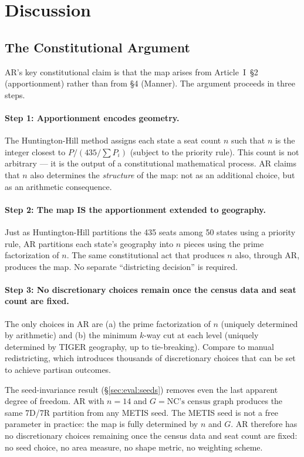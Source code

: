 \section{Discussion}
\label{sec:discussion}

\subsection{The Constitutional Argument}
\label{sec:discussion:constitutional}

AR's key constitutional claim is that the map arises from Article~I~\S2
(apportionment) rather than from \S4 (Manner). The argument proceeds in
three steps.

\paragraph{Step 1: Apportionment encodes geometry.}
The Huntington-Hill method assigns each state a seat count $n$ such that
$n$ is the integer closest to $P / (435/\sum P_i)$ (subject to the priority
rule). This count is not arbitrary --- it is the output of a constitutional
mathematical process. AR claims that $n$ also determines the \emph{structure}
of the map: not as an additional choice, but as an arithmetic consequence.

\paragraph{Step 2: The map IS the apportionment extended to geography.}
Just as Huntington-Hill partitions the 435 seats among 50 states using a
priority rule, AR partitions each state's geography into $n$ pieces using
the prime factorization of $n$. The same constitutional act that produces $n$
also, through AR, produces the map. No separate ``districting decision'' is
required.

\paragraph{Step 3: No discretionary choices remain once the census data and seat count are fixed.}
The only choices in AR are (a) the prime factorization of $n$ (uniquely
determined by arithmetic) and (b) the minimum $k$-way cut at each level
(uniquely determined by TIGER geography, up to tie-breaking). Compare to
manual redistricting, which introduces thousands of discretionary choices that
can be set to achieve partisan outcomes.

The seed-invariance result (\S\ref{sec:eval:seeds}) removes even the last
apparent degree of freedom. AR with $n = 14$ and $G = \text{NC's census graph}$
produces the same 7D/7R partition from any METIS seed. The METIS seed is
not a free parameter in practice: the map is fully determined by $n$ and $G$.
AR therefore has no discretionary choices remaining once the census data and
seat count are fixed: no seed choice, no area measure, no shape metric,
no weighting scheme.

